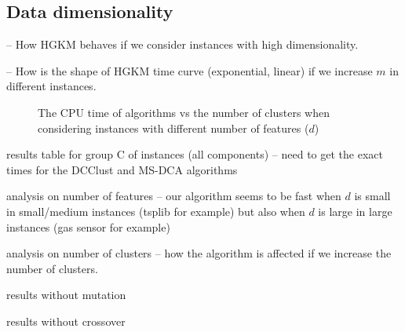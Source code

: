 \subsection{Data dimensionality}

-- How HGKM behaves if we consider instances with high dimensionality.

-- How is the shape of HGKM time curve (exponential, linear) if we increase $m$ in different instances. 

\begin{figure}[h!]
\centering
{}
\caption{The CPU time of algorithms vs the number of clusters when considering instances with different number of features ($d$)}
\end{figure}

\noindent [TO-DO] results table for group C of instances (all components) -- need to get the exact times for the DCClust and MS-DCA algorithms

\noindent [TO-DO] analysis on number of features -- our algorithm seems to be fast when $d$ is small in small/medium instances (tsplib for example) but also when $d$ is large in large instances (gas sensor for example)

\noindent [TO-DO] analysis on number of clusters -- how the algorithm is affected if we increase the number of clusters.

\noindent [TO-DO] results without mutation

\noindent [TO-DO] results without crossover